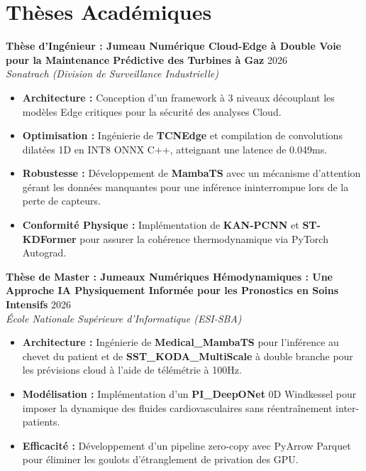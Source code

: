 \documentclass[a4paper,10pt]{article}
\begin{document}
\section{Thèses Académiques}
\noindent\textbf{Thèse d'Ingénieur : Jumeau Numérique Cloud-Edge à Double Voie pour la Maintenance Prédictive des Turbines à Gaz} \hfill 2026 \\
\textit{Sonatrach (Division de Surveillance Industrielle)}
\begin{itemize}
    \item \textbf{Architecture :} Conception d'un framework à 3 niveaux découplant les modèles Edge critiques pour la sécurité des analyses Cloud.
    \item \textbf{Optimisation :} Ingénierie de \textbf{TCNEdge} et compilation de convolutions dilatées 1D en INT8 ONNX C++, atteignant une latence de 0.049ms.
    \item \textbf{Robustesse :} Développement de \textbf{MambaTS} avec un mécanisme d'attention gérant les données manquantes pour une inférence ininterrompue lors de la perte de capteurs.
    \item \textbf{Conformité Physique :} Implémentation de \textbf{KAN-PCNN} et \textbf{ST-KDFormer} pour assurer la cohérence thermodynamique via PyTorch Autograd.
\end{itemize}

\noindent\textbf{Thèse de Master : Jumeaux Numériques Hémodynamiques : Une Approche IA Physiquement Informée pour les Pronostics en Soins Intensifs} \hfill 2026 \\
\textit{École Nationale Supérieure d'Informatique (ESI-SBA)}
\begin{itemize}
    \item \textbf{Architecture :} Ingénierie de \textbf{Medical\_MambaTS} pour l'inférence au chevet du patient et de \textbf{SST\_KODA\_MultiScale} à double branche pour les prévisions cloud à l'aide de télémétrie à 100Hz.
    \item \textbf{Modélisation :} Implémentation d'un \textbf{PI\_DeepONet} 0D Windkessel pour imposer la dynamique des fluides cardiovasculaires sans réentraînement inter-patients.
    \item \textbf{Efficacité :} Développement d'un pipeline zero-copy avec PyArrow Parquet pour éliminer les goulots d'étranglement de privation des GPU.
\end{itemize}
\end{document}
